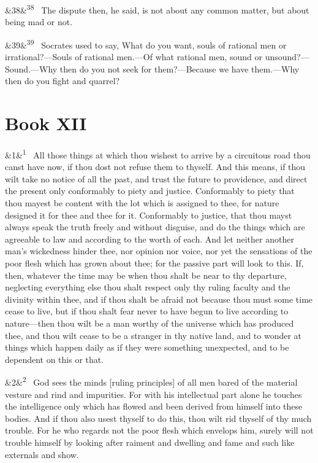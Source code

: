 \documentclass[12pt]{article}
\newcommand{\para}[1][]{\par\noindent\ifx&#1&\else\textsuperscript{\footnotesize #1}~\fi}
\begin{document}
\para[38] The dispute then, he said, is not about any common matter, but about
being mad or not.

\para[39] Socrates used to say, What do you want, souls of rational men or
irrational?---Souls of rational men.---Of what rational men, sound or
unsound?---Sound.---Why then do you not seek for them?---Because we have
them.---Why then do you fight and quarrel?

\section*{Book XII}

\para[1] All those things at which thou wishest to arrive by a circuitous road
thou canst have now, if thou dost not refuse them to thyself. And this
means, if thou wilt take no notice of all the past, and trust the future
to providence, and direct the present only conformably to piety and
justice. Conformably to piety that thou mayest be content with the lot
which is assigned to thee, for nature designed it for thee and thee for
it. Conformably to justice, that thou mayst always speak the truth
freely and without disguise, and do the things which are agreeable to
law and according to the worth of each. And let neither another man's
wickedness hinder thee, nor opinion nor voice, nor yet the sensations of
the poor flesh which has grown about thee; for the passive part will
look to this. If, then, whatever the time may be when thou shalt be near
to thy departure, neglecting everything else thou shalt respect only thy
ruling faculty and the divinity within thee, and if thou shalt be afraid
not because thou must some time cease to live, but if thou shalt fear
never to have begun to live according to nature---then thou wilt be a man
worthy of the universe which has produced thee, and thou wilt cease to
be a stranger in thy native land, and to wonder at things which happen
daily as if they were something unexpected, and to be dependent on this
or that.

\para[2] God sees the minds [ruling principles] of all men bared of the
material vesture and rind and impurities. For with his intellectual part
alone he touches the intelligence only which has flowed and been derived
from himself into these bodies. And if thou also usest thyself to do
this, thou wilt rid thyself of thy much trouble. For he who regards not
the poor flesh which envelops him, surely will not trouble himself by
looking after raiment and dwelling and fame and such like externals and
show.
\end{document}
